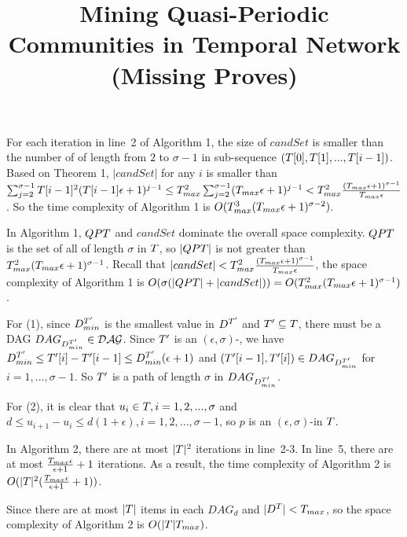 \documentclass[conference]{IEEEtran}
\newcommand{\mineaps}{Algorithm 1\xspace}
\newcommand{\subqpslimit}{Theorem 1\xspace}
\newcommand{\buildoracle}{Algorithm 2\xspace}
\begin{document}
	\title{Mining Quasi-Periodic Communities in Temporal Network (Missing Proves)}
	\maketitle
	
	 For each iteration in line~2 of \mineaps, the size of $ candSet $ is smaller than the number of \qptss of length from $ 2 $ to $ \sigma-1 $ in sub-sequence $ (T[0],T[1],...,T[i-1]) $. Based on \subqpslimit, $ |candSet| $ for any $ i $ is smaller than $ \sum_{j=2}^{\sigma-1}T[i-1]^2 (T[i-1] \epsilon+1)^{j-1}\leq T_{max}^2\sum_{j=2}^{\sigma-1}(T_{max}\epsilon+1)^{j-1} <T_{max}^2 \frac{(T_{max}\epsilon+1)^{\sigma-1}}{T_{max}\epsilon}$. So the time complexity of \mineaps is $ O(T_{max}^3(T_{max}\epsilon+1)^{\sigma-2}) $.
	
	In \mineaps, $ QPT $ and $ candSet $ dominate the overall space complexity. $ QPT $ is the set of all \qptss of length $ \sigma $ in $ T $, so $ |QPT| $ is not greater than $ T_{max}^2(T_{max}\epsilon+1)^{\sigma-1} $. Recall that $ |candSet|<T_{max}^2 \frac{(T_{max}\epsilon+1)^{\sigma-1}}{T_{max}\epsilon} $, the space complexity of \mineaps is $ O(\sigma(|QPT|+|candSet|))=O(T_{max}^2(T_{max}\epsilon+1)^{\sigma-1}) $.
	
	 For (1), since $ D_{min}^{T'} $ is the smallest value in $ D^{T'} $ and $ T'\subseteq T $, there must be a DAG $ DAG_{D_{min}^{T'}}\in \mathcal{DAG} $. Since $ T' $ is an $ (\epsilon,\sigma) $-\qpts, we have $ D_{min}^{T'}\leq T'[i]-T'[i-1] \leq D_{min}^{T'}(\epsilon+1) $ and $ (T'[i-1],T'[i])\in DAG_{D_{min}^{T'}} $ for $ i=1,...,\sigma-1 $. So $ T' $ is a path of length $ \sigma $ in $ DAG_{D_{min}^{T'}} $.
	
	For (2), it is clear that $ u_i\in T, i=1,2,...,\sigma $ and $ d\leq u_{i+1}-u_i\leq d(1+\epsilon),i=1,2,...,\sigma-1 $, so $ p $ is an $ (\epsilon,\sigma) $-\qpts in $ T $.
	
	 In \buildoracle, there are at most $ |T|^2 $ iterations in line~2-3. In line~5, there are at most $ \frac{T_{max}\epsilon}{\epsilon+1}+1 $ iterations. As a result, the time complexity of \buildoracle is $ O(|T|^2(\frac{T_{max}\epsilon}{\epsilon+1}+1)) $.
	
	Since there are at most $ |T| $ items in each $ DAG_d $ and $|D^{T}|<T_{max}$, so the space complexity of \buildoracle is $ O(|T|T_{max}) $.
	
\end{document}
